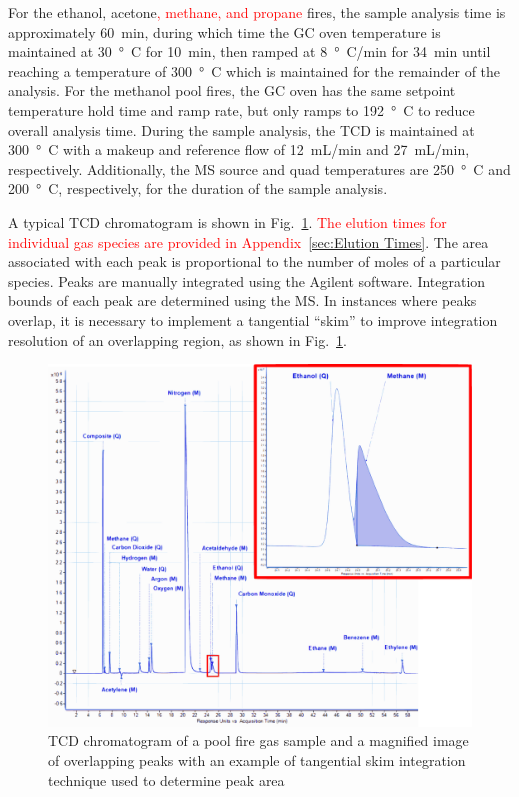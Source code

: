 \documentclass[12pt]{article}
\begin{document}
For the ethanol, acetone\textcolor{red}{, methane, and propane} fires, the sample analysis time is approximately \SI{60}{min}, during which time the GC oven temperature is maintained at \SI{30}{\degree C} for \SI{10}{min}, then ramped at \SI{8}{\degree C/min} for \SI{34}{min} until reaching a temperature of \SI{300}{\degree C} which is maintained for the remainder of the analysis. For the methanol pool fires, the GC oven has the same setpoint temperature hold time and ramp rate, but only ramps to \SI{192}{\degree C} to reduce overall analysis time. During the sample analysis, the TCD is maintained at \SI{300}{\degree C} with a makeup and reference flow of 12~mL/min and 27~mL/min, respectively. Additionally, the MS source and quad temperatures are \SI{250}{\degree C} and \SI{200}{\degree C}, respectively, for the duration of the sample analysis.

A typical TCD chromatogram is shown in Fig.~\ref{fig:Chromatogram}. \textcolor{red}{The elution times for individual gas species are provided in Appendix~\ref{sec:Elution Times}}. The area associated with each peak is proportional to the number of moles of a particular species. Peaks are manually integrated using the Agilent software. Integration bounds of each peak are determined using the MS. In instances where peaks overlap, it is necessary to implement a tangential ``skim'' to improve integration resolution of an overlapping region, as shown in Fig.~\ref{fig:Chromatogram}.

\begin{figure}[h!]
	\centering
\includegraphics[width=\textwidth,keepaspectratio]{Chromatogram.png}
	\caption[Chromatogram of a pool fire gas sample]{TCD chromatogram of a pool fire gas sample and a magnified image of overlapping peaks with an example of tangential skim integration technique used to determine peak area}
	\label{fig:Chromatogram}
\end{figure}
\end{document}
